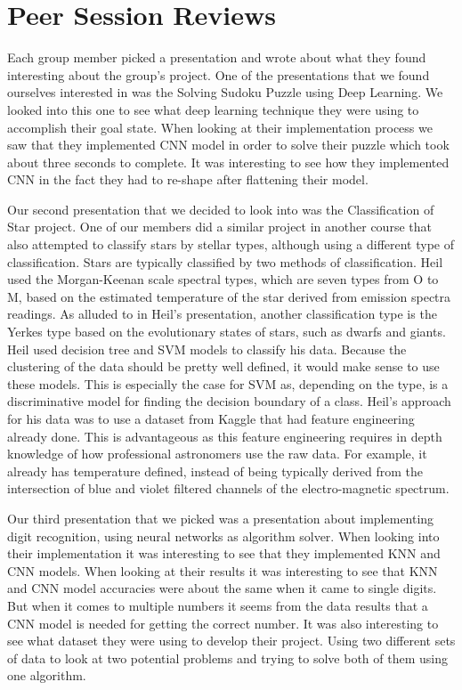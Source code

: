 \documentclass[10pt,journal,compsoc]{IEEEtran}
\begin{document}
\section{Peer Session Reviews}

Each group member picked a presentation and wrote about what they found
interesting about the group's project. One of the presentations that we found
ourselves interested in was the Solving Sudoku Puzzle using Deep Learning. We
looked into this one to see what deep learning technique they were using to
accomplish their goal state. When looking at their implementation process we saw
that they implemented CNN model in order to solve their puzzle which took about
three seconds to complete. It was interesting to see how they implemented CNN in
the fact they had to re-shape after flattening their model.

Our second presentation that we decided to look into was the Classification of
Star project. One of our members did a similar project in another course that
also attempted to classify stars by stellar types, although using a different
type of classification. Stars are typically classified by two methods of
classification. Heil used the Morgan-Keenan scale spectral types, which are
seven types from O to M, based on the estimated temperature of the star derived
from emission spectra readings. As alluded to in Heil's presentation, another
classification type is the Yerkes type based on the evolutionary states of
stars, such as dwarfs and giants. Heil used decision tree and SVM models to
classify his data. Because the clustering of the data should be pretty well
defined, it would make sense to use these models. This is especially the case
for SVM as, depending on the type, is a discriminative model for finding the
decision boundary of a class. Heil's approach for his data was to use a dataset
from Kaggle that had feature engineering already done. This is advantageous as
this feature engineering requires in depth knowledge of how professional
astronomers use the raw data. For example, it already has temperature defined,
instead of being typically derived from the intersection of blue and violet
filtered channels of the electro-magnetic spectrum.

Our third presentation that we picked was a presentation about implementing
digit recognition, using neural networks as algorithm solver. When looking into
their implementation it was interesting to see that they implemented KNN and CNN
models. When looking at their results it was interesting to see that KNN and CNN
model accuracies were about the same when it came to single digits. But when it
comes to multiple numbers it seems from the data results that a CNN model is
needed for getting the correct number. It was also interesting to see what
dataset they were using to develop their project. Using two different sets of
data to look at two potential  problems and trying to solve both of them using
one algorithm.
\end{document}
